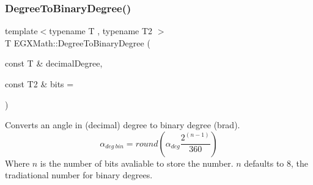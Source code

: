 \subsubsection{\texorpdfstring{Degree\+To\+Binary\+Degree()}{DegreeToBinaryDegree()}}
{\footnotesize\ttfamily template$<$typename T , typename T2 $>$ \\
T E\+G\+X\+Math\+::\+Degree\+To\+Binary\+Degree (\begin{DoxyParamCaption}\item[{const T \&}]{decimal\+Degree,  }\item[{const T2 \&}]{bits = {} }\end{DoxyParamCaption})}



Converts an angle in (decimal) degree to binary degree (brad). \[\alpha_{deg\ bin}=round(\alpha_{deg}\frac{2^{(n-1)}}{360})\] Where $n$ is the number of bits avaliable to store the number. $n$ defaults to 8, the tradiational number for binary degrees. 

